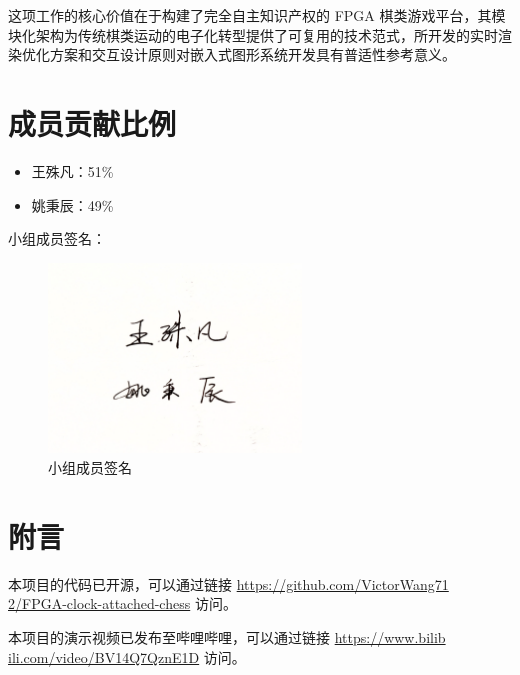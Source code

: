 \documentclass[a4paper, 12pt]{article}
\begin{document}
        这项工作的核心价值在于构建了完全自主知识产权的 FPGA 棋类游戏平台，其模块化架构为传统棋类运动的电子化转型提供了可复用的技术范式，所开发的实时渲染优化方案和交互设计原则对嵌入式图形系统开发具有普适性参考意义。

    \section{成员贡献比例}

        \begin{itemize}
            \item 王殊凡：51\%
            \item 姚秉辰：49\%
        \end{itemize}

        小组成员签名：

        \begin{figure}[H]
            \centering
            \includegraphics[width=0.6\textwidth]{signature}
            \caption{小组成员签名}
        \end{figure}

    \section{附言}

        本项目的代码已开源，可以通过链接 \href{https://github.com/VictorWang712/FPGA-clock-attached-chess}{\textsf{https://github.com/VictorWang71\\2/FPGA-clock-attached-chess}} 访问。

        本项目的演示视频已发布至哔哩哔哩，可以通过链接 \href{https://www.bilibili.com/video/BV14Q7QznE1D}{\textsf{https://www.bilib\\ili.com/video/BV14Q7QznE1D}} 访问。
\end{document}
